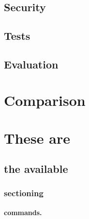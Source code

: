 \documentclass[
  digital, %
  oneside, %
  table,   %
  lof,     %
  lot,     %
]{fithesis3}
\begin{document}
\section{Security}
\section{Tests}
\section{Evaluation}

\chapter{Comparison}

\chapter{These are}
\section{the available}
\subsection{sectioning}
\subsubsection{commands.}
\end{document}
